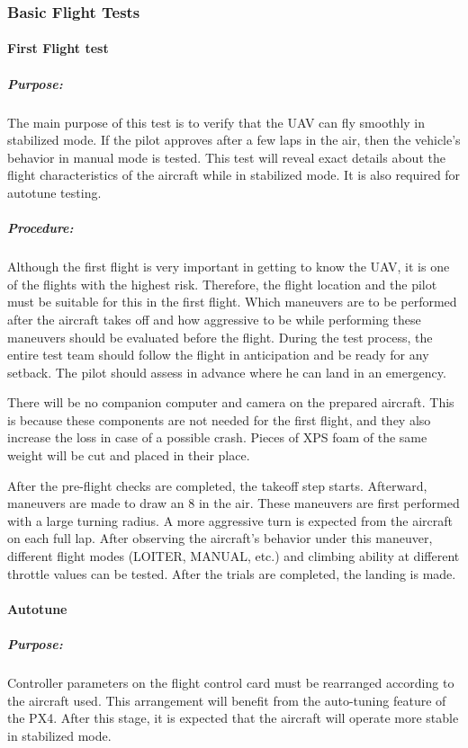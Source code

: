 \documentclass[12pt]{article}
\begin{document}
\subsubsection{Basic Flight Tests}

\paragraph{First Flight test}

\subparagraph*{Purpose:} The main purpose of this test is to verify that the UAV can fly smoothly in stabilized mode. If the pilot approves after a few laps in the air, then the vehicle's behavior in manual mode is tested. This test will reveal exact details about the flight characteristics of the aircraft while in stabilized mode. It is also required for autotune testing.

\subparagraph*{Procedure:}
Although the first flight is very important in getting to know the UAV, it is one of the flights with the highest risk. Therefore, the flight location and the pilot must be suitable for this in the first flight. Which maneuvers are to be performed after the aircraft takes off and how aggressive to be while performing these maneuvers should be evaluated before the flight. During the test process, the entire test team should follow the flight in anticipation and be ready for any setback. The pilot should assess in advance where he can land in an emergency. 

\justify
There will be no companion computer and camera on the prepared aircraft. This is because these components are not needed for the first flight, and they also increase the loss in case of a possible crash. Pieces of XPS foam of the same weight will be cut and placed in their place.

\justify
After the pre-flight checks are completed, the takeoff step starts. Afterward, maneuvers are made to draw an 8 in the air. These maneuvers are first performed with a large turning radius. A more aggressive turn is expected from the aircraft on each full lap. After observing the aircraft's behavior under this maneuver, different flight modes (LOITER, MANUAL, etc.) and climbing ability at different throttle values can be tested. After the trials are completed, the landing is made.

\paragraph{Autotune} 
\subparagraph*{Purpose:} Controller parameters on the flight control card must be rearranged according to the aircraft used. This arrangement will benefit from the auto-tuning feature of the PX4. After this stage, it is expected that the aircraft will operate more stable in stabilized mode.
\end{document}
